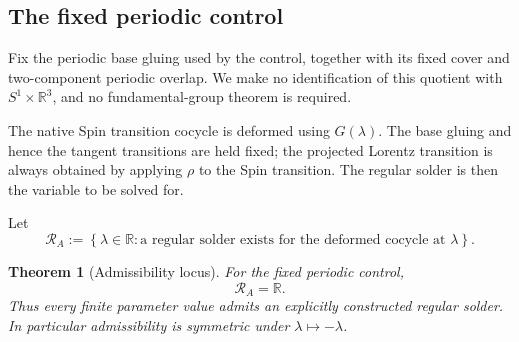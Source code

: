 \documentclass[11pt,a4paper]{article}
\newtheorem{theorem}{Theorem}[section]
\theoremstyle{definition}
\theoremstyle{remark}
\newcommand{\R}{\mathbb{R}}
\newcommand{\cR}{\mathcal{R}}
\begin{document}
\subsection{The fixed periodic control}

Fix the periodic base gluing used by the control, together with its fixed
cover and two-component periodic overlap.  We make no identification of
this quotient with \(S^{1}\times\R^{3}\), and no fundamental-group theorem
is required.

The native Spin transition cocycle is deformed using \(G(\lambda)\).
The base gluing and hence the tangent transitions are held fixed; the
projected Lorentz transition is always obtained by applying \(\rho\) to
the Spin transition.  The regular solder is then the variable to be solved
for.

Let
\[
  \cR_A
  :=
  \left\{
      \lambda\in\R:
      \text{a regular solder exists for the deformed cocycle at }\lambda
  \right\}.
\tag{11.5}
\]

\begin{theorem}[Admissibility locus]
\label{thm:admissibility}
For the fixed periodic control,
\[
   \cR_A=\R.
\tag{11.6}\label{eq:admissibility-region}
\]
Thus every finite parameter value admits an explicitly constructed regular
solder.  In particular admissibility is symmetric under
\(\lambda\mapsto-\lambda\).
\end{theorem}
\end{document}
